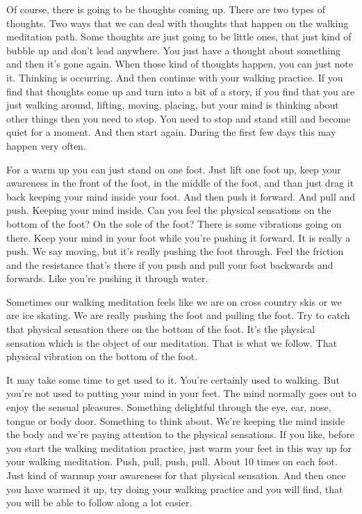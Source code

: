 \documentclass[letterpaper,10pt,english]{sphinxmanual}
\begin{document}
\sphinxAtStartPar
Of  course,  there  is  going  to  be  thoughts  coming  up.  There  are  two
types of thoughts. Two ways that we can deal with thoughts that happen on
the walking meditation path. Some thoughts are just going to be little ones,
that just kind of bubble up and don’t lead anywhere. You just have a thought
about  something  and  then  it’s  gone  again.  When  those  kind  of  thoughts
  happen, you can just note it. Thinking is occurring. And then continue with
your walking practice. If you find that thoughts come up and turn into a bit of
a story, if you find that you are just walking around, lifting, moving, placing,
but your mind is thinking about other things then you need to stop. You need
to stop and stand still and become quiet for a moment. And then start again.
During the first few days this may happen very often.

\sphinxAtStartPar
For  a  warm  up  you  can  just  stand  on  one  foot.  Just  lift  one  foot  up,
keep your awareness in the front of the foot, in the middle of the foot, and
than  just  drag  it  back  keeping  your  mind  inside  your  foot. And  then  push
it forward. And pull and push. Keeping your mind inside. Can you feel the
physical sensations on the bottom of the foot? On the sole of the foot? There
is some vibrations going on there. Keep your mind in your foot while you’re
pushing it forward. It is really a push. We say moving, but it’s really pushing
the foot through. Feel the friction and the resistance that’s there if you push
and pull your foot backwards and forwards. Like you’re pushing it through
water.

\sphinxAtStartPar
Sometimes our walking meditation feels like we are on cross country
skis  or  we  are  ice  skating. We  are  really  pushing  the  foot  and  pulling  the
foot. Try to catch that physical sensation there on the bottom of the foot. It’s
the physical sensation which is the object of our meditation. That is what we
follow. That physical vibration on the bottom of the foot.

\sphinxAtStartPar
It may take some time to get used to it. You’re certainly used to walking. But you’re not used to putting your mind in your feet. The mind normally goes out to enjoy the sensual pleasures. Something delightful through
the  eye,  ear,  nose,  tongue  or  body  door.  Something  to  think  about.  We’re
keeping the mind inside the body and we’re paying attention to the physical
sensations. If you like, before you start the walking meditation practice, just
warm your feet in this way up for your walking meditation. Push, pull, push,
pull. About 10 times on each foot. Just kind of warm\sphinxhyphen{}up your awareness for
that  physical  sensation. And  then  once  you  have  warmed  it  up,  try  doing
your walking practice and you will find, that you will be able to follow along
a lot easier.
\end{document}
